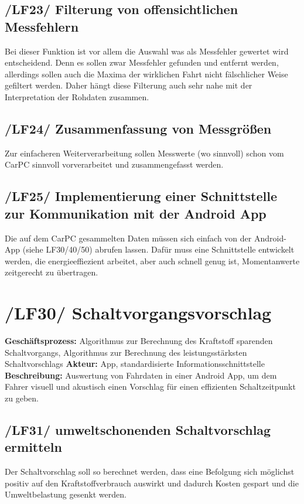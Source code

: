 \subsection{/LF23/ Filterung von offensichtlichen Messfehlern}
\nextline
Bei dieser Funktion ist vor allem die Auswahl was als Messfehler gewertet wird entscheidend. Denn es sollen zwar Messfehler gefunden und entfernt werden, allerdings sollen auch die Maxima der wirklichen Fahrt nicht fälschlicher Weise gefiltert werden. Daher hängt diese Filterung auch sehr nahe mit der Interpretation der Rohdaten zusammen.

\subsection{/LF24/ Zusammenfassung von Messgrößen}
\nextline
Zur einfacheren Weiterverarbeitung sollen Messwerte (wo sinnvoll) schon vom CarPC sinnvoll vorverarbeitet und zusammengefasst werden.

\subsection{/LF25/ Implementierung einer Schnittstelle zur Kommunikation mit der Android App}
\nextline
Die auf dem CarPC gesammelten Daten müssen sich einfach von der Android-App (siehe LF30/40/50) abrufen lassen. Dafür muss eine Schnittstelle entwickelt werden, die energieeffiezient arbeitet, aber auch schnell genug ist, Momentanwerte zeitgerecht zu übertragen.
\newpage

\section{/LF30/ Schaltvorgangsvorschlag}
\textbf{Geschäftsprozess:}	Algorithmus zur Berechnung des Kraftstoff sparenden Schaltvorgangs, Algorithmus zur Berechnung des leistungsstärksten Schaltvorschlags
\textbf{Akteur:}			App, standardisierte Informationsschnittstelle
\textbf{Beschreibung:}	Auswertung von Fahrdaten in einer Android App, um dem Fahrer visuell und akustisch einen Vorschlag für einen effizienten Schaltzeitpunkt zu geben. 

\subsection{/LF31/ umweltschonenden Schaltvorschlag ermitteln}
\nextline
Der Schaltvorschlag soll so berechnet werden, dass eine Befolgung sich möglichst positiv auf den Kraftstoffverbrauch auswirkt und dadurch Kosten gespart und die Umweltbelastung gesenkt werden.

